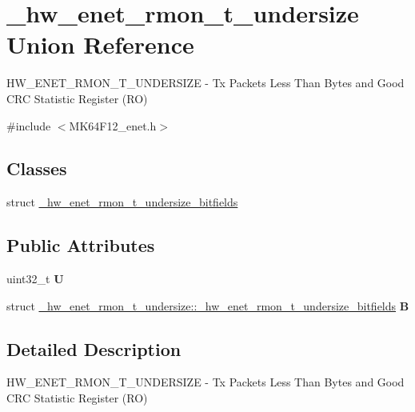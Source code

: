 \hypertarget{union__hw__enet__rmon__t__undersize}{}\section{\+\_\+hw\+\_\+enet\+\_\+rmon\+\_\+t\+\_\+undersize Union Reference}
\label{union__hw__enet__rmon__t__undersize}


H\+W\+\_\+\+E\+N\+E\+T\+\_\+\+R\+M\+O\+N\+\_\+\+T\+\_\+\+U\+N\+D\+E\+R\+S\+I\+ZE -\/ Tx Packets Less Than Bytes and Good C\+RC Statistic Register (RO)  




{\ttfamily \#include $<$M\+K64\+F12\+\_\+enet.\+h$>$}

\subsection*{Classes}
\begin{DoxyCompactItemize}
\item 
struct \hyperlink{struct__hw__enet__rmon__t__undersize_1_1__hw__enet__rmon__t__undersize__bitfields}{\+\_\+hw\+\_\+enet\+\_\+rmon\+\_\+t\+\_\+undersize\+\_\+bitfields}
\end{DoxyCompactItemize}
\subsection*{Public Attributes}
\begin{DoxyCompactItemize}
\item 
uint32\+\_\+t {\bfseries U}\hypertarget{union__hw__enet__rmon__t__undersize_afd94c9ba24fe4e8a740c1f9d3489af32}{}\label{union__hw__enet__rmon__t__undersize_afd94c9ba24fe4e8a740c1f9d3489af32}

\item 
struct \hyperlink{struct__hw__enet__rmon__t__undersize_1_1__hw__enet__rmon__t__undersize__bitfields}{\+\_\+hw\+\_\+enet\+\_\+rmon\+\_\+t\+\_\+undersize\+::\+\_\+hw\+\_\+enet\+\_\+rmon\+\_\+t\+\_\+undersize\+\_\+bitfields} {\bfseries B}\hypertarget{union__hw__enet__rmon__t__undersize_a5ac0ba61a7e7eda780306c2d3bf177e5}{}\label{union__hw__enet__rmon__t__undersize_a5ac0ba61a7e7eda780306c2d3bf177e5}

\end{DoxyCompactItemize}


\subsection{Detailed Description}
H\+W\+\_\+\+E\+N\+E\+T\+\_\+\+R\+M\+O\+N\+\_\+\+T\+\_\+\+U\+N\+D\+E\+R\+S\+I\+ZE -\/ Tx Packets Less Than Bytes and Good C\+RC Statistic Register (RO) 

